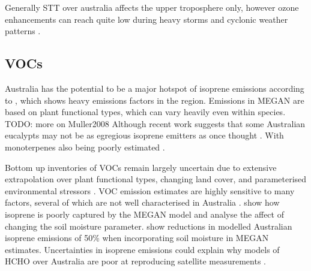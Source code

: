     Generally STT over australia affects the upper troposphere only, however ozone enhancements can reach quite low during heavy storms and cyclonic weather patterns \parencite{Alexander2013}.
  
  \subsection{VOCs}
  
    Australia has the potential to be a major hotspot of isoprene emissions according to \textcite{Guenther2006,Guenther2012}, which shows heavy emissions factors in the region.
    Emissions in MEGAN are based on plant functional types, which can vary heavily even within species.
    TODO: more on Muller2008
    Although recent work suggests that some Australian eucalypts may not be as egregious isoprene emitters as once thought \textcite{Emmerson2016}.
    With monoterpenes also being poorly estimated \parencite{Winters2009,Emmerson2016,}.
    
    Bottom up inventories of VOCs remain largely uncertain due to extensive extrapolation over plant functional types, changing land cover, and parameterised environmental stressors \parencite{Guenther2000,Kanakidou2005,Millet2006}.
    VOC emission estimates are highly sensitive to many factors, several of which are not well characterised in Australia \parencite{Sindelarova2014, Bauwens2016}.
    \textcite{Muller2008} show how isoprene is poorly captured by the MEGAN model and analyse the affect of changing the soil moisture parameter.
    \textcite{Sindelarova2014} show reductions in modelled Australian isoprene emissions of 50\% when incorporating soil moisture in MEGAN estimates. 
    Uncertainties in isoprene emissions could explain why models of HCHO over Australia are poor at reproducing satellite measurements \parencite{Stavrakou2009}.
    
